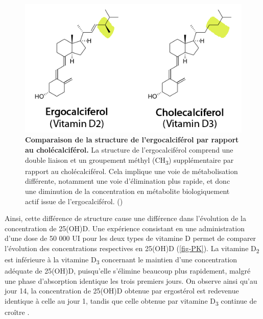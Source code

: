 \documentclass[
  a4paper,
  DIV=11,
  numbers=noendperiod,
  listof=totoc]{scrreprt}
\begin{document}
\begin{figure}
\includegraphics{figures/ergo_vs_chole.png} 
\caption[\textbf{Comparaison de la structure de l'ergocalciférol par rapport au cholécalciférol.}]
{\textbf{Comparaison de la structure de l'ergocalciférol par rapport au cholécalciférol.} La structure de l'ergocalciférol comprend une double liaison et un groupement méthyl (CH\textsubscript{3}) supplémentaire par rapport au cholécalciférol. Cela implique une voie de métabolisation différente, notamment une voie d'élimination plus rapide, et donc une diminution de la concentration en métabolite biologiquement actif issue de l'ergocalciférol. (\cite{Houghton.2006})}
\label{fig:ergo-struc}
\end{figure}

Ainsi, cette différence de structure cause une différence dans
l'évolution de la concentration de 25(OH)D. Une expérience consistant en
une administration d'une dose de 50 000 UI pour les deux types de
vitamine D permet de comparer l'évolution des concentrations respectives
en 25(OH)D (\cref{fig-PK}). La vitamine D\textsubscript{2} est
inférieure à la vitamine D\textsubscript{3} concernant le maintien d'une
concentration adéquate de 25(OH)D, puisqu'elle s'élimine beaucoup plus
rapidement, malgré une phase d'absorption identique les trois premiers
jours. On observe ainsi qu'au jour 14, la concentration de 25(OH)D
obtenue par ergostérol est redevenue identique à celle au jour 1, tandis
que celle obtenue par vitamine D\textsubscript{3} continue de croître
\autocite{Armas.2004}.
\end{document}
